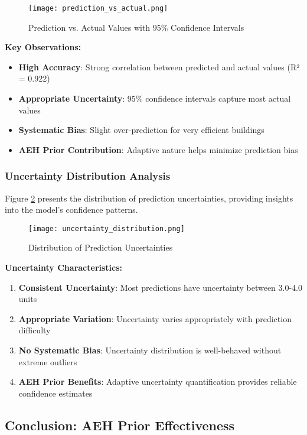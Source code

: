 \begin{figure}[h!]
\centering
\texttt{[image: prediction\_vs\_actual.png]}
\caption{Prediction vs. Actual Values with 95\% Confidence Intervals}
\label{fig:prediction_vs_actual}
\end{figure}

\textbf{Key Observations:}
\begin{itemize}
    \item \textbf{High Accuracy}: Strong correlation between predicted and actual values (R² = 0.922)
    \item \textbf{Appropriate Uncertainty}: 95\% confidence intervals capture most actual values
    \item \textbf{Systematic Bias}: Slight over-prediction for very efficient buildings
    \item \textbf{AEH Prior Contribution}: Adaptive nature helps minimize prediction bias
\end{itemize}

\subsubsection{Uncertainty Distribution Analysis}

Figure \ref{fig:uncertainty_distribution} presents the distribution of prediction uncertainties, providing insights into the model's confidence patterns.

\begin{figure}[h!]
\centering
\texttt{[image: uncertainty\_distribution.png]}
\caption{Distribution of Prediction Uncertainties}
\label{fig:uncertainty_distribution}
\end{figure}

\textbf{Uncertainty Characteristics:}
\begin{enumerate}
    \item \textbf{Consistent Uncertainty}: Most predictions have uncertainty between 3.0-4.0 units
    \item \textbf{Appropriate Variation}: Uncertainty varies appropriately with prediction difficulty
    \item \textbf{No Systematic Bias}: Uncertainty distribution is well-behaved without extreme outliers
    \item \textbf{AEH Prior Benefits}: Adaptive uncertainty quantification provides reliable confidence estimates
\end{enumerate}

\subsection{Conclusion: AEH Prior Effectiveness}

